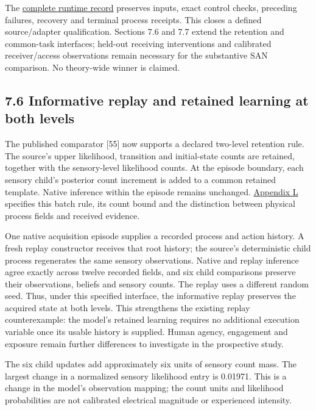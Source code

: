 \documentclass[
  american,
  11pt,
  letterpaper,
]{article}
\begin{document}
The \href{https://github.com/v5ma/v5ma.github.io/blob/master/papers/companions/learning-to-feel-v1.0/ARTIFACT-AVAILABILITY.md#artifact-39}{complete runtime record} preserves inputs, exact control checks, preceding failures, recovery and terminal process receipts. This closes a defined source/adapter qualification. Sections 7.6 and 7.7 extend the retention and common-task interfaces; held-out receiving interventions and calibrated receiver/access observations remain necessary for the substantive SAN comparison. No theory-wide winner is claimed.

\par\ifdim\dimexpr\pagegoal-\pagetotal\relax<100pt\newpage\fi
\subsection{7.6 Informative replay and retained learning at both levels}\label{informative-replay-and-retained-learning-at-both-levels}

The published comparator {[}55{]} now supports a declared two-level retention rule. The source's upper likelihood, transition and initial-state counts are retained, together with the sensory-level likelihood counts. At the episode boundary, each sensory child's posterior count increment is added to a common retained template. Native inference within the episode remains unchanged. \href{https://raw.githubusercontent.com/v5ma/v5ma.github.io/master/papers/companions/learning-to-feel-v1.0/Learning-to-Feel-Technical-Supplement-v1.0.pdf\#appendix-l}{Appendix L} specifies this batch rule, its count bound and the distinction between physical process fields and received evidence.

One native acquisition episode supplies a recorded process and action history. A fresh replay constructor receives that root history; the source's deterministic child process regenerates the same sensory observations. Native and replay inference agree exactly across twelve recorded fields, and six child comparisons preserve their observations, beliefs and sensory counts. The replay uses a different random seed. Thus, under this specified interface, the informative replay preserves the acquired state at both levels. This strengthens the existing replay counterexample: the model's retained learning requires no additional execution variable once its usable history is supplied. Human agency, engagement and exposure remain further differences to investigate in the prospective study.

The six child updates add approximately six units of sensory count mass. The largest change in a normalized sensory likelihood entry is 0.01971. This is a change in the model's observation mapping; the count units and likelihood probabilities are not calibrated electrical magnitude or experienced intensity.
\end{document}
